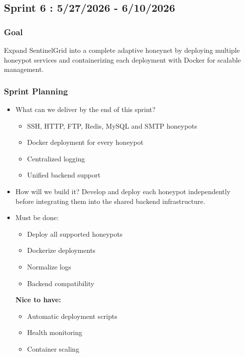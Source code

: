 \documentclass{article}
\begin{document}
\subsection{Sprint 6 : 5/27/2026 - 6/10/2026}
\subsubsection{Goal}
Expand SentinelGrid into a complete adaptive honeynet by deploying multiple honeypot services and containerizing each deployment with Docker for scalable management.

\subsubsection{Sprint Planning}

\begin{itemize}
    \item What can we deliver by the end of this sprint? 
    \begin{itemize}
    \item SSH, HTTP, FTP, Redis, MySQL and SMTP honeypots
    \item Docker deployment for every honeypot
    \item Centralized logging
    \item Unified backend support
    \end{itemize}
   
    \item How will we build it? 
    Develop and deploy each honeypot independently before integrating them into the shared backend infrastructure.

  
    \item Must be done:
    
    \begin{itemize}
    \item Deploy all supported honeypots
    \item Dockerize deployments
    \item Normalize logs
    \item Backend compatibility
    \end{itemize}
    
    \textbf{Nice to have:}
    
    \begin{itemize}
    \item Automatic deployment scripts
    \item Health monitoring
    \item Container scaling
    \end{itemize}

\end{itemize}
\end{document}
